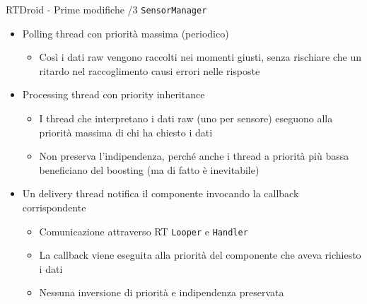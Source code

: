 \begin{frame}{RTDroid - Prime modifiche /3}
	\texttt{SensorManager}
	\begin{itemize}
		\item Polling thread con priorità massima (periodico)
		\begin{itemize}
			\item Così i dati raw vengono raccolti nei momenti giusti, senza rischiare che un ritardo nel raccoglimento causi errori nelle risposte
		\end{itemize}
		\item Processing thread con priority inheritance
		\begin{itemize}
			\item I thread che interpretano i dati raw (uno per sensore) eseguono alla priorità massima di chi ha chiesto i dati
			\item Non preserva l'indipendenza, perché anche i thread a priorità più bassa beneficiano del boosting (ma di fatto è inevitabile)
		\end{itemize}
		\item Un delivery thread notifica il componente invocando la callback corrispondente
		\begin{itemize}
			\item Comunicazione attraverso RT \texttt{Looper} e \texttt{Handler}
			\item La callback viene eseguita alla priorità del componente che aveva richiesto i dati
			\item Nessuna inversione di priorità e indipendenza preservata
		\end{itemize}
	\end{itemize}
\end{frame}
